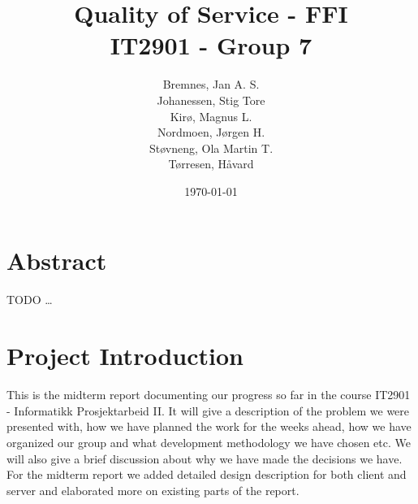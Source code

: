 \documentclass[titlepage, a4paper]{article}
\title{
    Quality of Service - FFI \\
    IT2901 - Group 7  \\ 
}
\author{
    Bremnes, Jan A. S. \\  
    Johanessen, Stig Tore \\
    Kirø, Magnus L.\\
    Nordmoen, Jørgen H.\\ 
    Støvneng, Ola Martin T.\\
    Tørresen, Håvard \\
}
\date{\today}
\begin{document}
\maketitle
\section*{Abstract}\label{abstract}
	TODO \ldots
\newpage

\tableofcontents
\listoffigures
\listoftables


\section{Project Introduction}\label{Project Introduction}
    This is the midterm report documenting our progress so far in the course IT2901 - Informatikk Prosjektarbeid II. It will give a description of the problem we were presented with, how we have planned the work for the weeks ahead, how we have organized our group and what development methodology we have chosen etc. We will also give a brief discussion about why we have made the decisions we have. For the midterm report we added detailed design description for both client and server and elaborated more on existing parts of the report. 











\appendix
\printglossaries


%


\end{document}
